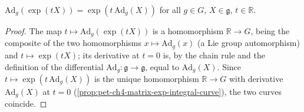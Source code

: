 \begin{proposition}
  \label{prop:pet-ch4-adjoint-exp-relation}
  \leanok
  $\mathrm{Ad}_g(\exp(tX))=\exp(t\,\mathrm{Ad}_g(X))$ for all $g\in G$, $X\in\mathfrak g$, $t\in\mathbb{R}$.
\end{proposition}
\begin{proof}
  \leanok
  The map $t\mapsto\mathrm{Ad}_g(\exp(tX))$ is a homomorphism $\mathbb{R}\to G$, being
  the composite of the two homomorphisms $x\mapsto\mathrm{Ad}_g(x)$ (a Lie group
  automorphism) and $t\mapsto\exp(tX)$; its derivative at $t=0$ is, by the
  chain rule and the definition of the differential $\mathrm{Ad}_g:\mathfrak g\to\mathfrak g$,
  equal to $\mathrm{Ad}_g(X)$. Since $t\mapsto\exp(t\,\mathrm{Ad}_g(X))$ is the unique
  homomorphism $\mathbb{R}\to G$ with derivative $\mathrm{Ad}_g(X)$ at $t=0$
  (\cref{prop:pet-ch4-matrix-exp-integral-curve}), the two curves coincide.
\end{proof}


